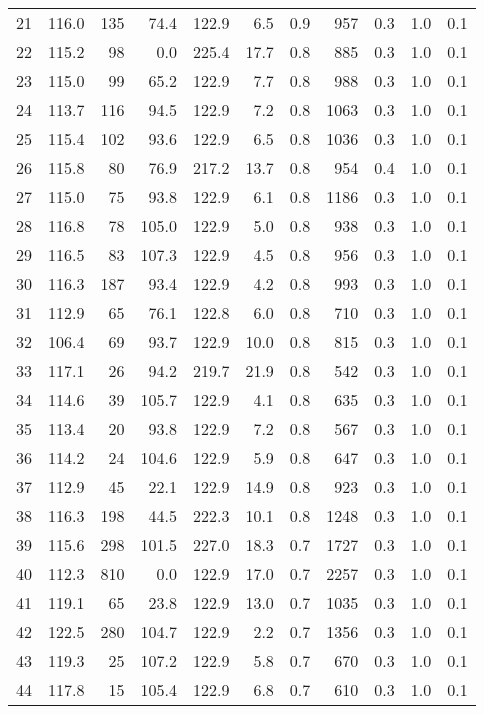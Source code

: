 \begin{tabular}{|r|rrrrr|rrrrr|}
21 & 116.0 & 135 & 74.4 & 122.9 & 6.5 & 0.9 & 957 & 0.3 & 1.0 & 0.1 \\
22 & 115.2 & 98 & 0.0 & 225.4 & 17.7 & 0.8 & 885 & 0.3 & 1.0 & 0.1 \\
23 & 115.0 & 99 & 65.2 & 122.9 & 7.7 & 0.8 & 988 & 0.3 & 1.0 & 0.1 \\
24 & 113.7 & 116 & 94.5 & 122.9 & 7.2 & 0.8 & 1063 & 0.3 & 1.0 & 0.1 \\
25 & 115.4 & 102 & 93.6 & 122.9 & 6.5 & 0.8 & 1036 & 0.3 & 1.0 & 0.1 \\
26 & 115.8 & 80 & 76.9 & 217.2 & 13.7 & 0.8 & 954 & 0.4 & 1.0 & 0.1 \\
27 & 115.0 & 75 & 93.8 & 122.9 & 6.1 & 0.8 & 1186 & 0.3 & 1.0 & 0.1 \\
28 & 116.8 & 78 & 105.0 & 122.9 & 5.0 & 0.8 & 938 & 0.3 & 1.0 & 0.1 \\
29 & 116.5 & 83 & 107.3 & 122.9 & 4.5 & 0.8 & 956 & 0.3 & 1.0 & 0.1 \\
30 & 116.3 & 187 & 93.4 & 122.9 & 4.2 & 0.8 & 993 & 0.3 & 1.0 & 0.1 \\
31 & 112.9 & 65 & 76.1 & 122.8 & 6.0 & 0.8 & 710 & 0.3 & 1.0 & 0.1 \\
32 & 106.4 & 69 & 93.7 & 122.9 & 10.0 & 0.8 & 815 & 0.3 & 1.0 & 0.1 \\
33 & 117.1 & 26 & 94.2 & 219.7 & 21.9 & 0.8 & 542 & 0.3 & 1.0 & 0.1 \\
34 & 114.6 & 39 & 105.7 & 122.9 & 4.1 & 0.8 & 635 & 0.3 & 1.0 & 0.1 \\
35 & 113.4 & 20 & 93.8 & 122.9 & 7.2 & 0.8 & 567 & 0.3 & 1.0 & 0.1 \\
36 & 114.2 & 24 & 104.6 & 122.9 & 5.9 & 0.8 & 647 & 0.3 & 1.0 & 0.1 \\
37 & 112.9 & 45 & 22.1 & 122.9 & 14.9 & 0.8 & 923 & 0.3 & 1.0 & 0.1 \\
38 & 116.3 & 198 & 44.5 & 222.3 & 10.1 & 0.8 & 1248 & 0.3 & 1.0 & 0.1 \\
39 & 115.6 & 298 & 101.5 & 227.0 & 18.3 & 0.7 & 1727 & 0.3 & 1.0 & 0.1 \\
40 & 112.3 & 810 & 0.0 & 122.9 & 17.0 & 0.7 & 2257 & 0.3 & 1.0 & 0.1 \\
41 & 119.1 & 65 & 23.8 & 122.9 & 13.0 & 0.7 & 1035 & 0.3 & 1.0 & 0.1 \\
42 & 122.5 & 280 & 104.7 & 122.9 & 2.2 & 0.7 & 1356 & 0.3 & 1.0 & 0.1 \\
43 & 119.3 & 25 & 107.2 & 122.9 & 5.8 & 0.7 & 670 & 0.3 & 1.0 & 0.1 \\
44 & 117.8 & 15 & 105.4 & 122.9 & 6.8 & 0.7 & 610 & 0.3 & 1.0 & 0.1 \\

\end{tabular}
